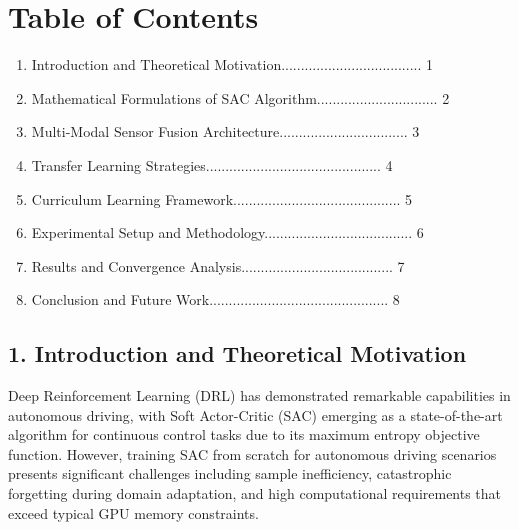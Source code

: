 \documentclass[10pt,a4paper,twocolumn]{article}
\begin{document}
\section*{Table of Contents}
\begin{enumerate}
    \item Introduction and Theoretical Motivation.................................... 1
    \item Mathematical Formulations of SAC Algorithm............................... 2
    \item Multi-Modal Sensor Fusion Architecture................................. 3
    \item Transfer Learning Strategies............................................. 4
    \item Curriculum Learning Framework........................................... 5
    \item Experimental Setup and Methodology...................................... 6
    \item Results and Convergence Analysis....................................... 7
    \item Conclusion and Future Work.............................................. 8
\end{enumerate}

\vfill

\subsection*{1. Introduction and Theoretical Motivation}

Deep Reinforcement Learning (DRL) has demonstrated remarkable capabilities in autonomous driving, with Soft Actor-Critic (SAC) emerging as a state-of-the-art algorithm for continuous control tasks due to its maximum entropy objective function. However, training SAC from scratch for autonomous driving scenarios presents significant challenges including sample inefficiency, catastrophic forgetting during domain adaptation, and high computational requirements that exceed typical GPU memory constraints.
\end{document}
